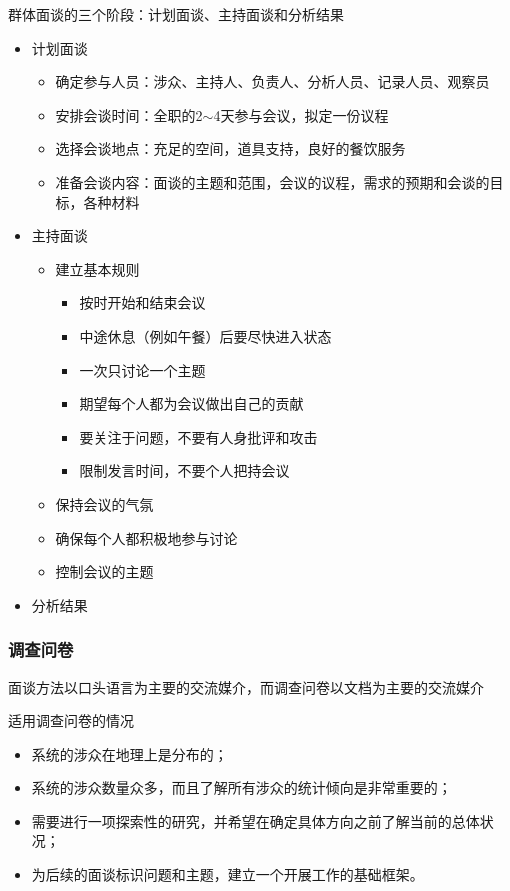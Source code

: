 群体面谈的三个阶段：计划面谈、主持面谈和分析结果
\begin{itemize}
    \item 计划面谈
    \begin{itemize}
        \item 确定参与人员：涉众、主持人、负责人、分析人员、记录人员、观察员
        \item 安排会谈时间：全职的2$\sim$4天参与会议，拟定一份议程
        \item 选择会谈地点：充足的空间，道具支持，良好的餐饮服务
        \item 准备会谈内容：面谈的主题和范围，会议的议程，需求的预期和会谈的目标，各种材料
    \end{itemize}
    \item 主持面谈
    \begin{itemize}
        \item 建立基本规则
        \vspace{-1em}
        \begin{multicols}{2}
        \begin{itemize}
            \item 按时开始和结束会议
            \item 中途休息（例如午餐）后要尽快进入状态
            \item 一次只讨论一个主题
            \item 期望每个人都为会议做出自己的贡献
            \item 要关注于问题，不要有人身批评和攻击
            \item 限制发言时间，不要个人把持会议   
        \end{itemize}
        \end{multicols}
        \vspace{-1em}
        \item 保持会议的气氛
        \item 确保每个人都积极地参与讨论
        \item 控制会议的主题
    \end{itemize}
    \item 分析结果
\end{itemize}

\subsubsection{调查问卷}
面谈方法以口头语言为主要的交流媒介，而调查问卷以文档为主要的交流媒介

适用调查问卷的情况
\begin{itemize}
    \item 系统的涉众在地理上是分布的；
    \item 系统的涉众数量众多，而且了解所有涉众的统计倾向是非常重要的；
    \item 需要进行一项探索性的研究，并希望在确定具体方向之前了解当前的总体状况；
    \item 为后续的面谈标识问题和主题，建立一个开展工作的基础框架。
\end{itemize}

